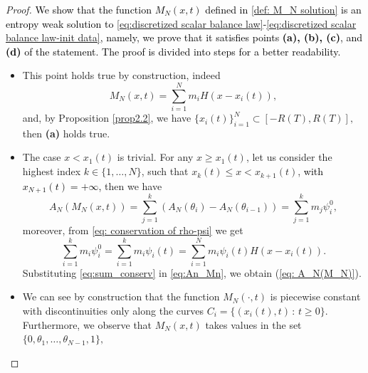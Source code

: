\documentclass[11pt,a4paper,oneside]{amsart}
\begin{document}
\begin{proof}
\textcolor{black}{%
We show that the function $M_N(x,t)$ defined in \eqref{def: M_N solution} is an entropy weak solution to \eqref{eq:discretized scalar balance law}-\eqref{eq:discretized scalar balance law-init data}, namely, we prove that it satisfies points \textbf{(a), (b), (c)}, and \textbf{(d)} of the statement. The proof is divided into steps for a better readability.
}
\begin{itemize}   
    \item[\textbf{(a)}] This point holds true by construction, indeed
    $$
    M_N(x,t)=\sum_{i=1}^N m_i H(x-x_i(t)),
    $$
    and, by Proposition \ref{prop2.2}, we have $\{x_i(t)\}_{i=1}^N\subset [-R(T),R(T)],$ then \textbf{(a)} holds true.
    \item[\textbf{(b)}]
    The case $x<x_1(t)$ is trivial.
    For any $x\geq x_1(t)$,  let us consider the highest index $k\in\{1,\dots,N\}$, such that $x_k(t)\leq x<x_{k+1}(t)$, \textcolor{black}{with $x_{N+1}(t)=+\infty$,} then we have 
    \begin{equation}\label{eq:An_Mn}
        A_N(M_N(x,t))=\sum_{j=1}^k (A_N(\theta_i)-A_N(\theta_{i-1}))=\sum_{j=1}^k m_j\psi_i^0,
    \end{equation}
    moreover, from \eqref{eq: conservation of rho-psi} we get
    \begin{equation}\label{eq:sum_conserv}
        \sum_{i=1}^k m_i\psi_i^0=\sum_{i=1}^k m_i\psi_i(t)=\sum_{i=1}^N m_i\psi_i(t)H(x-x_i(t)).
    \end{equation}
    Substituting \eqref{eq:sum_conserv} in \eqref{eq:An_Mn}, we obtain (\ref{eq: A_N(M_N)}).
    \item[\textbf{(c)}] 
    We can see by construction that the function $M_N(\cdot,t)$ is piecewise constant with discontinuities only along the curves $C_i=\{(x_i(t),t)\,:\,t\geq0\}$. 
    Furthermore, we observe that $M_N(x,t)$ takes values in the set $\{0,\theta_1,\ldots,\theta_{N-1},1\},$

\end{itemize}
\end{proof}
\end{document}
